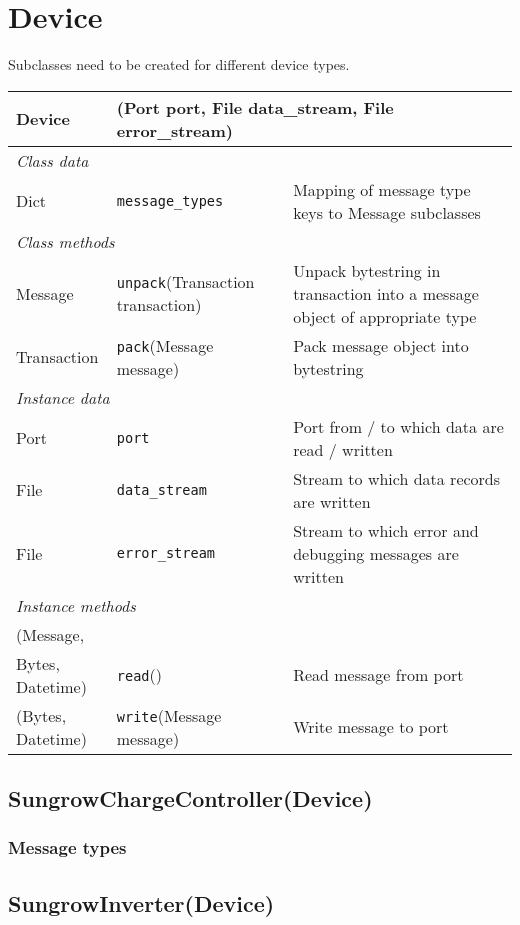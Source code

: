 \documentclass[pdftex,oneside,12pt,a4paper]{book}
\begin{document}
\section{Device}
Subclasses need to be created for different device types.

\noindent
\begin{tabular}{|p{0.2\linewidth}p{0.35\linewidth}p{0.45\linewidth}|}
\hline
Device & \multicolumn{2}{l|}{(Port port, File data\_stream, File error\_stream)} \\
\hline\multicolumn{3}{|l|}{\small\emph{Class data}}\\
Dict & \verb|message_types| & Mapping of message type keys to Message subclasses \\
\hline\multicolumn{3}{|l|}{\small\emph{Class methods}}\\
Message & \verb|unpack|(Transaction transaction) & Unpack bytestring in transaction into a message object of appropriate type\\
Transaction & \verb|pack|(Message message) & Pack message object into bytestring\\
\hline\multicolumn{3}{|l|}{\small\emph{Instance data}}\\
Port & \verb|port| & Port from / to which data are read / written \\
File & \verb|data_stream| & Stream to which data records are written \\
File & \verb|error_stream| & Stream to which error and debugging messages are written \\
\hline\multicolumn{3}{|l|}{\small\emph{Instance methods}}\\
(Message, & & \\
Bytes, Datetime) & \verb|read|() & Read message from port\\
(Bytes, Datetime) & \verb|write|(Message message) & Write message to port\\
\hline
\end{tabular}

\subsection{SungrowChargeController(Device)}
\subsubsection{Message types}

\subsection{SungrowInverter(Device)}
\end{document}
